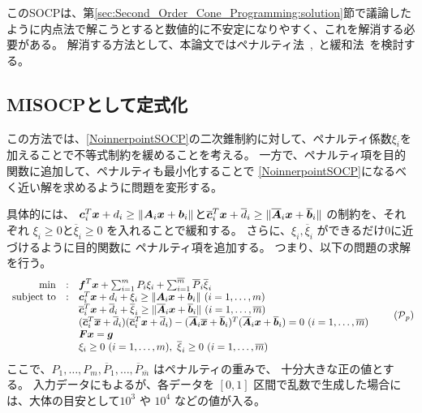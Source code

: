 \documentclass[11pt,a4paper,dvipdfmx,titlepage,uplatex]{jsarticle}
\theoremstyle{mystyle}
\newcommand{\0}{\mathbf{0}}
\def\b{\mbox{\boldmath $b$}}
\def\c{\mbox{\boldmath $c$}}
\def\f{\mbox{\boldmath $f$}}
\def\g{\mbox{\boldmath $g$}}
\def\x{\mbox{\boldmath $x$}}
\def\A{\mbox{\boldmath $A$}}
\def\F{\mbox{\boldmath $F$}}
\def\PC{\mbox{$\cal P$}}
\begin{document}
このSOCPは、第\ref{sec:Second_Order_Cone_Programming:solution}節で議論したように内点法で解こうとすると数値的に不安定になりやすく、これを解消する必要がある。
解消する方法として、本論文ではペナルティ法~\cite{benson2007exact},~\cite{fukuda2012differentiable}と緩和法~\cite{liu2020globally}を検討する。

\subsection{MISOCPとして定式化}\label{sec:Deformation_penalty}
この方法では、\eqref{NoinnerpointSOCP}の二次錐制約に対して、ペナルティ係数$\xi_i$を加えることで不等式制約を緩めることを考える。
一方で、ペナルティ項を目的関数に追加して、ペナルティも最小化することで
\eqref{NoinnerpointSOCP}になるべく近い解を求めるように問題を変形する。

具体的には、
$\c_i^T \x + d_i \ge \|\A_i \x + \b_i\| $と$
\overline{\c}_i^T \x + \overline{d}_i \ge \| \overline{\A}_i \x + \overline{\b}_i\|
$ の制約を、それぞれ
$\xi_i \ge 0$と$\overline{\xi}_i \ge 0$ を入れることで緩和する。
さらに、$\xi_i, \overline{\xi}_i$ ができるだけ$0$に近づけるように目的関数に
ペナルティ項を追加する。
つまり、以下の問題の求解を行う。
\begin{align}
	\begin{array}{rcl}
		\min & : & \f^T \x + \sum_{i=1}^{m} P_i \xi_i + \sum_{i=1}^{\overline{m}} \overline{P}_i \overline{\xi}_i \\
		\text{subject to} & : & \c_i^T \x + d_i+\xi_i \ge \|\A_i \x + \b_i\|
		\ (i=1, \ldots, m) \\
		& & \overline{\c}_i^T \x + \overline{d}_i + \overline{\xi}_i \ge \| \overline{\A}_i \x + \overline{\b}_i\|
		\ (i=1, \ldots, \overline{m}) \\
		& & (\overline{\c}_i^T \overline{\x} + \overline{d}_i)(\overline{\c}_i^T \x + \overline{d}_i)
    -
    (\overline{\A}_i \overline{\x} + \overline{\b}_i)^T(\overline{\A}_i \x + \overline{\b}_i) = 0 \ (i=1, \ldots, \overline{m}) \\
		& & \F \x = \g \\
		& & \xi_i \geq 0 \ (i=1, \ldots, m), \ \overline{\xi}_i \geq 0 \ (i=1, \ldots, \overline{m})
	\end{array}
  \tag{$\PC_p$}
  \label{NoinnerpointSOCP:penalty}
\end{align}
ここで、$P_1, \ldots, P_m , \overline{P}_1, \ldots, \overline{P}_{\overline{m}}$ はペナルティの重みで、
十分大きな正の値とする。
入力データにもよるが、各データを $[0,1]$ 区間で乱数で生成した場合には、大体の目安として$10^3$ や $10^4$ などの値が入る。
\end{document}
